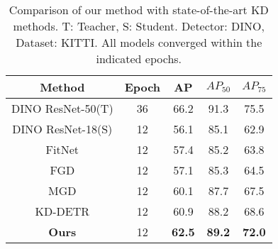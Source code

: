 

\begin{table}[h]
\centering
\begin{tabular}{c|cccc}
\toprule
Method & Epoch & AP & $AP_{50}$ & $AP_{75}$ \\ \midrule
DINO ResNet-50(T) & 36 & 66.2 & 91.3 & 75.5  \\ 
DINO ResNet-18(S) & 12 & 56.1 & 85.1 & 62.9  \\ 
FitNet & 12 & 57.4 & 85.2 & 63.8 \\
FGD & 12 & 57.1 & 85.3 & 64.5 \\ 
MGD & 12 & 60.1 & 87.7 & 67.5 \\ 
KD-DETR & 12 & 60.9 & 88.2 & 68.6  \\ \midrule
\textbf{Ours} & 12 & \textbf{62.5} & \textbf{89.2} & \textbf{72.0} \\ \bottomrule
\end{tabular}
\caption{Comparison of our method with state-of-the-art KD methods. T: Teacher, S: Student. Detector: DINO, Dataset: KITTI. All models converged within the indicated epochs.}
\label{tab:kd methods}
\end{table}